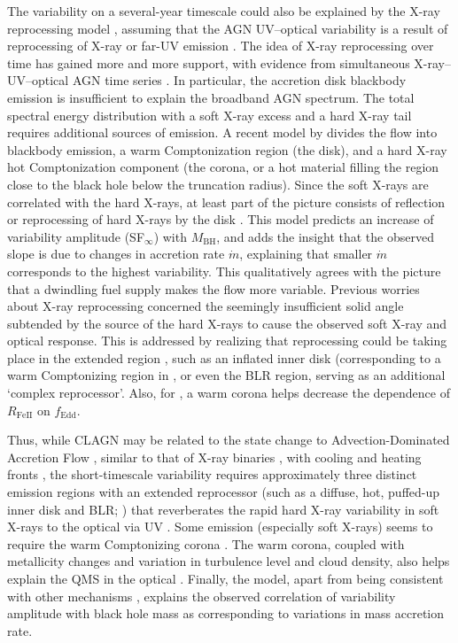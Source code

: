 \documentclass[twocolumn]{aastex62}
\begin{document}
The variability on a several-year timescale could also be explained by the X-ray reprocessing model \citep{kokubo2015, kubota2018}, assuming that the AGN UV--optical variability is a result of reprocessing of X-ray or far-UV emission \citep{krolik1991}.  The idea of X-ray reprocessing  over time has gained more and more support, with evidence from simultaneous X-ray--UV--optical AGN time series \citep{edelson2014, mchardy2018,  zhu2018}. In particular, the accretion disk blackbody emission is insufficient to explain the broadband AGN spectrum. The total spectral energy distribution with a soft X-ray excess and a hard X-ray tail requires additional sources of emission. A recent model by \citet{kubota2018} divides the flow into blackbody emission, a warm Comptonization region (the disk), and a hard X-ray hot Comptonization component (the corona, or a hot material filling the region close to the black hole below the truncation radius).  Since the soft X-rays are correlated with the hard X-rays, at least part of the picture consists of reflection or reprocessing of hard X-rays by the disk \citep{lawrence2018}. This model predicts an increase of variability amplitude (SF$_{\infty}$) with $M_{\mathrm{BH}}$, and adds the insight that the observed slope is due to changes in accretion rate $\dot{m}$, explaining that smaller $\dot{m}$ corresponds to the highest variability. This qualitatively agrees with the picture that a dwindling fuel supply makes the flow more variable. Previous worries about X-ray reprocessing concerned the seemingly insufficient solid angle subtended by the source of the hard X-rays to cause the observed soft X-ray and optical response. This is addressed by realizing that reprocessing could be taking place in the extended region \citep{gardner2017}, such as an inflated inner disk (corresponding to a warm Comptonizing region in \citealt{kubota2018}, or even the BLR region, serving as an additional `complex reprocessor'\citep{mchardy2018}. Also, for \citet{panda2019a}, a warm corona helps decrease the dependence of $R_{\mathrm{Fe  II}}$ on $f_{\mathrm{Edd}}$. 

Thus, while CLAGN may be related to the state change to Advection-Dominated Accretion Flow \citep{sniegowska2019}, similar to that of X-ray binaries \citep{noda2018,ruan2019}, with cooling and heating fronts \citep{ross2018}, the short-timescale variability requires approximately three distinct emission regions \citep{kubota2018} with an extended reprocessor (such as a diffuse, hot, puffed-up inner disk and BLR; \citealt{mchardy2018}) that reverberates the rapid hard X-ray variability in soft X-rays to the optical via UV \citep{fausnaugh2018}. Some emission (especially soft X-rays) seems to require the warm Comptonizing corona \citep{kubota2018}. The warm corona, coupled with metallicity changes and variation in turbulence level and cloud density, also helps explain the QMS in the optical \citep{panda2019a,panda2019b}. Finally, the \citet{kubota2018} model, apart from being consistent with other mechanisms \citep{lawrence2018, mchardy2018, panda2019a, ross2018, ruan2019, sniegowska2019}, explains the observed correlation of variability amplitude with black hole mass as corresponding to variations in mass accretion rate. 
\end{document}
